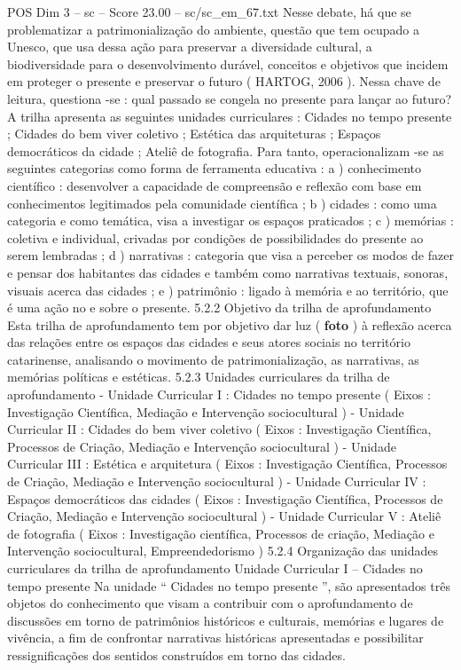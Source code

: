 \begin{textsample}{POS Dim 3 – sc – Score 23.00 – sc/sc\_em\_67.txt}
Nesse debate, há que se problematizar a patrimonialização do ambiente, questão que tem ocupado a Unesco, que usa dessa ação para preservar a diversidade cultural, a biodiversidade para o desenvolvimento durável, conceitos e objetivos que incidem em proteger o presente e preservar o futuro ( HARTOG, 2006 ).
Nessa chave de leitura, questiona -se : qual passado se congela no presente para lançar ao futuro?
A trilha apresenta as seguintes unidades curriculares : Cidades no tempo presente ; Cidades do bem viver coletivo ; Estética das arquiteturas ; Espaços democráticos da cidade ; Ateliê de fotografia.
Para tanto, operacionalizam -se as seguintes categorias como forma de ferramenta educativa : a ) conhecimento científico : desenvolver a capacidade de compreensão e reflexão com base em conhecimentos legitimados pela comunidade científica ; b ) cidades : como uma categoria e como temática, visa a investigar os espaços praticados ; c ) memórias : coletiva e individual, crivadas por condições de possibilidades do presente ao serem lembradas ; d ) narrativas : categoria que visa a perceber os modos de fazer e pensar dos habitantes das cidades e também como narrativas textuais, sonoras, visuais acerca das cidades ; e ) patrimônio : ligado à memória e ao território, que é uma ação no e sobre o presente. 5.2.2 Objetivo da trilha de aprofundamento Esta trilha de aprofundamento tem por objetivo dar luz ( \textbf{foto} ) à reflexão acerca das relações entre os espaços das cidades e seus atores sociais no território catarinense, analisando o movimento de patrimonialização, as narrativas, as memórias políticas e estéticas. 5.2.3 Unidades curriculares da trilha de aprofundamento - Unidade Curricular I : Cidades no tempo presente ( Eixos : Investigação Científica, Mediação e Intervenção sociocultural ) - Unidade Curricular II : Cidades do bem viver coletivo ( Eixos : Investigação Científica, Processos de Criação, Mediação e Intervenção sociocultural ) - Unidade Curricular III : Estética e arquitetura ( Eixos : Investigação Científica, Processos de Criação, Mediação e Intervenção sociocultural ) - Unidade Curricular IV : Espaços democráticos das cidades ( Eixos : Investigação Científica, Processos de Criação, Mediação e Intervenção sociocultural ) - Unidade Curricular V : Ateliê de fotografia ( Eixos : Investigação científica, Processos de criação, Mediação e Intervenção sociocultural, Empreendedorismo ) 5.2.4 Organização das unidades curriculares da trilha de aprofundamento Unidade Curricular I – Cidades no tempo presente Na unidade “ Cidades no tempo presente ”, são apresentados três objetos do conhecimento que visam a contribuir com o aprofundamento de discussões em torno de patrimônios históricos e culturais, memórias e lugares de vivência, a fim de confrontar narrativas históricas apresentadas e possibilitar ressignificações dos sentidos construídos em torno das cidades.

\end{textsample}
